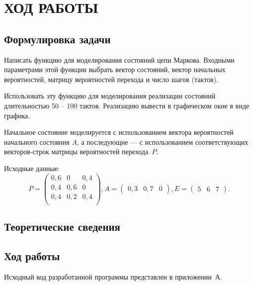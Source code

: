 \section{ХОД РАБОТЫ}

\subsection{Формулировка задачи}

Написать функцию для моделирования состояний цепи Маркова.
Входными параметрами этой функции выбрать вектор состояний, 
вектор начальных вероятностей, матрицу вероятностей перехода и
число шагов (тактов).

Использовать эту функцию для моделирования реализации состояний длительностью 
50 -- 100 тактов.
Реализацию вывести в графическом окне в виде графика.

Начальное состояние моделируется с использованием вектора
вероятностей начального состояния $ A $, а последующие --- с использованием 
соответствующих векторов-строк матрицы вероятностей перехода~$ P $.

Исходные данные: 
\begin{equation*}
P = \begin{pmatrix}
      0{,}6 & 0 & 0{,}4 \\
      0{,}4 & 0{,}6 & 0 \\
      0{,}4 & 0{,}2 & 0{,}4 \\
    \end{pmatrix},                            
A = \begin{pmatrix}
      0{,}3 & 0{,}7 & 0
    \end{pmatrix},
E = \begin{pmatrix}
      5 & 6 & 7
    \end{pmatrix}.
\end{equation*}


\subsection{Теоретические сведения}

\pagebreak

\subsection{Ход работы}

Исходный код разработанной программы представлен в приложении~А.

